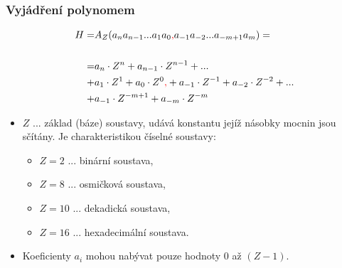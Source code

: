 	\begin{frame}
    \frametitle{Vyjádření polynomem}
		
		\begin{minipage}[t][0.4\textheight][t]{\textwidth}
      \small
			\boldmath
			\begin{align*}
			H =& A_{Z}(a_{n} a_{n-1} ... a_{1} a_{0}\textcolor{red}{,} a_{-1} a_{-2} ... a_{-m+1} a_{m}) =\\ \\
				=& a_{n} \cdot Z^n + a_{n-1} \cdot Z^{n-1} + ...\\ 
				+& a_{1} \cdot Z^1 + a_{0} \cdot Z^0\textcolor{red}{,} + a_{-1} \cdot Z^{-1} + a_{-2} \cdot Z^{-2} + ...\\ 
				+& a_{-1} \cdot Z^{-m+1} + a_{-m} \cdot Z^{-m}
			\end{align*}
		\end{minipage}
		
		\begin{minipage}[t][0.5\textheight][t]{\textwidth}
			\boldmath
			\begin{itemize}
				\item $Z$ ... základ (báze) soustavy, udává konstantu jejíž násobky mocnin jsou sčítány. Je charakteristikou číselné soustavy:
					\begin{itemize}
						\item $Z=2$ ... binární soustava,
						\item $Z=8$ ... osmičková soustava,
						\item $Z=10$ ... dekadická soustava,
						\item $Z=16$ ... hexadecimální soustava.
					\end{itemize}
				
				\item Koeficienty $a_{i}$ mohou nabývat pouze hodnoty $0$ až $(Z-1)$.
			\end{itemize}
			
		\end{minipage}
	\end{frame}
  
